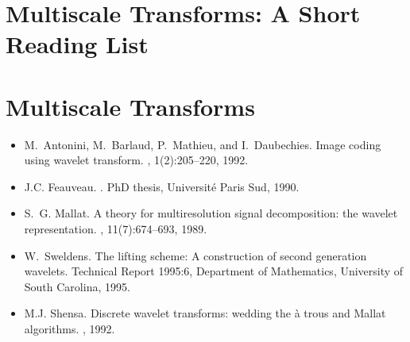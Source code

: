 

\section*{Multiscale Transforms: A Short Reading List}

\section{Multiscale Transforms}
\begin{itemize}

\item
M.~Antonini, M.~Barlaud, P.~Mathieu, and I.~Daubechies.
\newblock Image coding using wavelet transform.
, 1(2):205--220, 1992.

\item
J.C. Feauveau.
.
\newblock PhD thesis, Universit\'e Paris Sud, 1990.

\item S.~G. Mallat.
\newblock A theory for multiresolution signal decomposition: the wavelet
  representation.
,
  11(7):674--693, 1989.

\item W.~Sweldens.
\newblock The lifting scheme: {A} construction of second generation wavelets.
\newblock Technical Report 1995:6, Department of Mathematics, University of
  South Carolina, 1995. 


\item M.J. Shensa.
\newblock Discrete wavelet transforms: wedding the \`a trous and Mallat
  algorithms.
, 1992.

\end{itemize}


